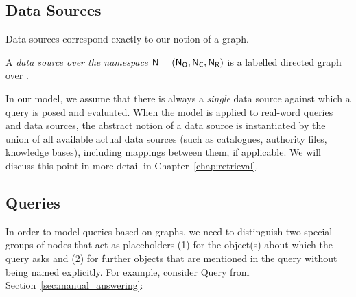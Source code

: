 \subsection{Data Sources}
\label{subsec:data_sources}

Data sources correspond exactly to our notion of a graph.
%
\begin{definition}
  \label{def:data_source}
  A \emph{data source over the namespace $\textup{\textsf{N}}=(\mathsf{N}_\mathsf{O},\mathsf{N}_\mathsf{C},\mathsf{N}_\mathsf{R})$} is a labelled directed graph
  over \namespace.
\end{definition}
%
In our model, we assume that there is always a \emph{single} data source against which a query is posed and evaluated.
When the model is applied to real-word queries and data sources,
the abstract notion of a data source is instantiated by the union of
all available actual data sources (such as catalogues, authority files, knowledge bases),
including mappings between them, if applicable.
We will discuss this point in more detail in Chapter~\ref{chap:retrieval}.

\subsection{Queries}

In order to model queries based on graphs, we need to distinguish
two special groups of nodes that act as placeholders (1) for the object(s) about which the query asks
and (2) for further objects that are mentioned in the query without being named explicitly.
For example, consider Query  from Section~\ref{sec:manual_answering}:
%
\Qtwoprime


